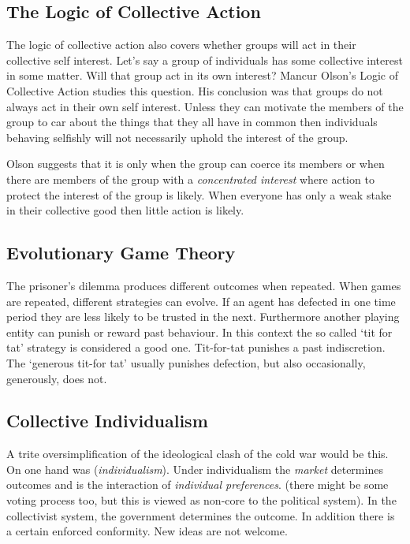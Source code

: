 \documentclass[]{tufte-handout}
\begin{document}
\hypertarget{the-logic-of-collective-action}{%
\subsection{The Logic of Collective
Action}\label{the-logic-of-collective-action}}

The logic of collective action also covers whether groups will act in
their collective self interest. Let's say a group of individuals has
some collective interest in some matter. Will that group act in its own
interest? Mancur Olson's Logic of Collective Action studies this
question. His conclusion was that groups do not always act in their own
self interest. Unless they can motivate the members of the group to car
about the things that they all have in common then individuals behaving
selfishly will not necessarily uphold the interest of the group.

Olson suggests that it is only when the group can coerce its members or
when there are members of the group with a \emph{concentrated interest}
where action to protect the interest of the group is likely. When
everyone has only a weak stake in their collective good then little
action is likely.

\hypertarget{evolutionary-game-theory}{%
\subsection{Evolutionary Game Theory}\label{evolutionary-game-theory}}

The prisoner's dilemma produces different outcomes when repeated. When
games are repeated, different strategies can evolve. If an agent has
defected in one time period they are less likely to be trusted in the
next. Furthermore another playing entity can punish or reward past
behaviour. In this context the so called `tit for tat' strategy is
considered a good one. Tit-for-tat punishes a past indiscretion. The
`generous tit-for tat' usually punishes defection, but also
occasionally, generously, does not.

\hypertarget{collective-individualism}{%
\subsection{Collective Individualism}\label{collective-individualism}}

A trite oversimplification of the ideological clash of the cold war
would be this. On one hand was (\emph{individualism}). Under
individualism the \emph{market} determines outcomes and is the
interaction of \emph{individual preferences}. (there might be some
voting process too, but this is viewed as non-core to the political
system). In the collectivist system, the government determines the
outcome. In addition there is a certain enforced conformity. New ideas
are not welcome.
\end{document}
